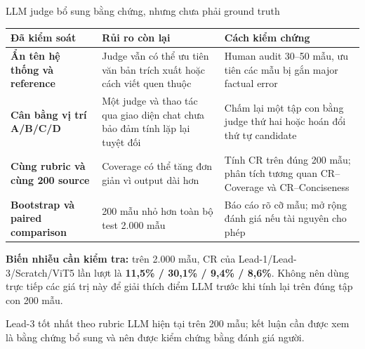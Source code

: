 \documentclass[aspectratio=169,10pt]{beamer}
\begin{document}
\begin{frame}{LLM judge bổ sung bằng chứng, nhưng chưa phải ground truth}
  \scriptsize
  \renewcommand{\arraystretch}{1.27}
  \setlength{\tabcolsep}{4.0pt}
  \begin{tabularx}{\textwidth}{>{\bfseries\RaggedRight\arraybackslash}p{2.75cm}X X}
    \toprule
    \textbf{Đã kiểm soát} & \textbf{Rủi ro còn lại} & \textbf{Cách kiểm chứng}\\
    \midrule
    Ẩn tên hệ thống và reference
      & Judge vẫn có thể ưu tiên văn bản trích xuất hoặc cách viết quen thuộc
      & Human audit 30--50 mẫu, ưu tiên các mẫu bị gắn major factual error\\
    \rowcolor{LightGray}
    Cân bằng vị trí A/B/C/D
      & Một judge và thao tác qua giao diện chat chưa bảo đảm tính lặp lại tuyệt đối
      & Chấm lại một tập con bằng judge thứ hai hoặc hoán đổi thứ tự candidate\\
    Cùng rubric và cùng 200 source
      & Coverage có thể tăng đơn giản vì output dài hơn
      & Tính CR trên đúng 200 mẫu; phân tích tương quan CR--Coverage và CR--Conciseness\\
    \rowcolor{LightGray}
    Bootstrap và paired comparison
      & 200 mẫu nhỏ hơn toàn bộ test 2.000 mẫu
      & Báo cáo rõ cỡ mẫu; mở rộng đánh giá nếu tài nguyên cho phép\\
    \bottomrule
  \end{tabularx}

  \vspace{1.2mm}
  \begin{softbox}
    \small
    \textbf{Biến nhiễu cần kiểm tra:} trên 2.000 mẫu, CR của Lead-1/Lead-3/Scratch/ViT5 lần lượt là \textbf{11,5\% / 30,1\% / 9,4\% / 8,6\%}. Không nên dùng trực tiếp các giá trị này để giải thích điểm LLM trước khi tính lại trên đúng tập con 200 mẫu.
  \end{softbox}

  \vspace{0.7mm}
  \begin{keymessage}
    \scriptsize Lead-3 tốt nhất theo rubric LLM hiện tại trên 200 mẫu; kết luận cần được xem là bằng chứng bổ sung và nên được kiểm chứng bằng đánh giá người.
  \end{keymessage}
\end{frame}
\end{document}
